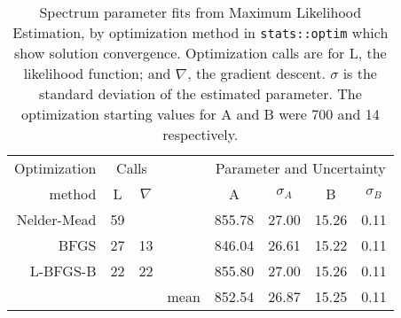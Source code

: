 \begin{table}[ht]
\caption{Spectrum parameter fits from Maximum Likelihood Estimation, 
by optimization method in \texttt{stats::optim} which show solution convergence. 
Optimization calls are for
L, the likelihood function; and $\nabla$, the gradient descent.
$\sigma$ is the standard deviation of the estimated parameter.
The optimization starting values for A and B were 700 and 14 respectively.
}
\begin{center}
\begin{tabular}{rccrcccc}
\hline
Optimization & \multicolumn{2}{c}{Calls} & & \multicolumn{4}{c}{Parameter and Uncertainty}\\
\cline{2-3}
\cline{5-8}
method & L & $\nabla$ & & A & $\sigma_A$ & B & $\sigma_B$ \\ 
\hline
Nelder-Mead & 59 &  & & 855.78 & {\footnotesize 27.00 } & 15.26 & {\footnotesize 0.11 } \\ 
BFGS & 27 & 13 & & 846.04 & {\footnotesize 26.61 } & 15.22 & {\footnotesize 0.11 } \\ 
L-BFGS-B & 22 & 22 & & 855.80 & {\footnotesize 27.00 } & 15.26 & {\footnotesize 0.11 } \\ 
\cline{5-8}
 & &  & mean & 852.54 & {\footnotesize 26.87 } & 15.25 & {\footnotesize 0.11 } \\ 
\hline
\end{tabular}
\end{center}
\label{tbl:magmle}
\end{table}
